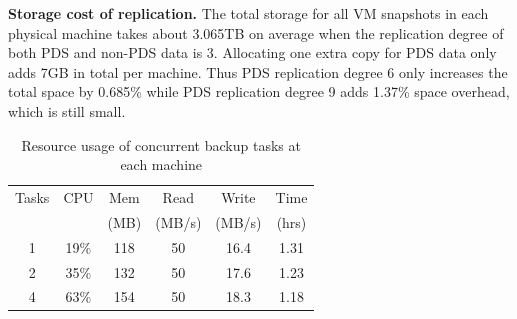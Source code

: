 {\bf Storage cost of replication.} 
The total storage  for all VM snapshots in each physical machine takes about 3.065TB on average when
the replication degree of both PDS and non-PDS data is 3. 
Allocating  one extra  copy for PDS data only adds  7GB in total per machine.
Thus PDS replication degree 6 only increases the total space by 0.685\% while PDS replication degree 9 adds 1.37\% 
space overhead, which is still small.

\begin{table}
    \begin{tabular}{|c|c|c|c|c|c|}
    \hline
    Tasks & CPU & Mem &Read &  Write  & Time  \\ 
    & & (MB)          &(MB/s) &  (MB/s) & (hrs) \\ \hline
    1     & 19\% & 118 & 50 & 16.4 & 1.31\\ \hline
    2     & 35\% & 132 &50  & 17.6 & 1.23\\ \hline
    4     & 63\% & 154&50   & 18.3 & 1.18\\ \hline
    \end{tabular}
\caption{Resource usage of concurrent backup tasks at each machine}
\label{tab:resource_usage}
\end{table}


